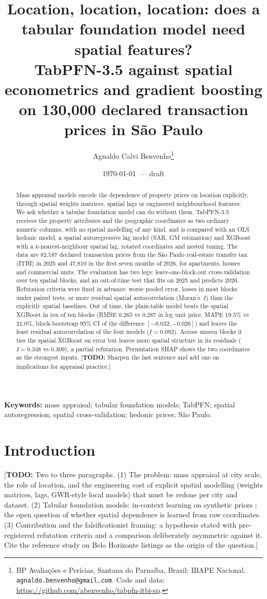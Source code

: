 \documentclass[11pt,a4paper]{article}
\title{Location, location, location: does a tabular foundation model need spatial features?\\
\large TabPFN-3.5 against spatial econometrics and gradient boosting on 130{,}000 declared
transaction prices in São Paulo}
\author{Agnaldo Calvi Benvenho\thanks{BP Avaliações e Perícias, Santana do Parnaíba, Brazil;
IBAPE Nacional. \texttt{agnaldo.benvenho@gmail.com}. Code and data:
\url{https://github.com/abenvenho/tabpfn-itbi-sp}.}}
\date{\today\ --- draft}
\newcommand{\todo}[1]{\textcolor{red!70!black}{[\textbf{TODO:} #1]}}
\begin{document}
\maketitle

\begin{abstract}
Mass appraisal models encode the dependence of property prices on location explicitly, through
spatial weights matrices, spatial lags or engineered neighbourhood features. We ask whether a
tabular foundation model can do without them. TabPFN-3.5 receives the property attributes and the
geographic coordinates as two ordinary numeric columns, with no spatial modelling of any kind, and is
compared with an OLS hedonic model, a spatial autoregressive lag model (SAR, GM estimation) and
XGBoost with a $k$-nearest-neighbour spatial lag, rotated coordinates and nested tuning. The data
are 82{,}187 declared transaction prices from the São Paulo real-estate transfer tax (ITBI) in 2025
and 47{,}810 in the first seven months of 2026, for apartments, houses and commercial units. The
evaluation has two legs: leave-one-block-out cross-validation over ten spatial blocks, and an
out-of-time test that fits on 2025 and predicts 2026. Refutation criteria were fixed in advance:
worse pooled error, losses in most blocks under paired tests, or more residual spatial
autocorrelation (Moran's~$I$) than the explicitly spatial baselines. Out of time, the plain-table
model beats the spatial XGBoost in ten of ten blocks (RMSE $0.265$ vs $0.287$ in log unit price,
MAPE $19.5\%$ vs $21.0\%$, block-bootstrap 95\% CI of the difference $[-0.032,-0.026]$) and leaves
the least residual autocorrelation of the four models ($I = 0.092$). Across unseen blocks it ties
the spatial XGBoost on error but leaves more spatial structure in its residuals ($I = 0.348$ vs
$0.309$), a partial refutation. Permutation SHAP shows the two coordinates as the strongest inputs.
\todo{Sharpen the last sentence and add one on implications for appraisal practice.}
\end{abstract}

\noindent\textbf{Keywords:} mass appraisal; tabular foundation models; TabPFN; spatial
autoregression; spatial cross-validation; hedonic prices; São Paulo.

\section{Introduction}
\label{sec:intro}

\todo{Two to three paragraphs. (1) The problem: mass appraisal at city scale, the role of location,
and the engineering cost of explicit spatial modelling (weights matrices, lags, GWR-style local
models) that must be redone per city and dataset. (2) Tabular foundation models: in-context
learning on synthetic priors \citep{hollmann2023tabpfn,hollmann2025nature,priorlabs2026tabpfn3};
the open question of whether spatial dependence is learned from raw coordinates. (3) Contribution
and the falsificationist framing: a hypothesis stated with pre-registered refutation criteria and a
comparison deliberately asymmetric against it. Cite the reference study on Belo Horizonte listings
\citep{benvenho2026cead} as the origin of the question.}
\end{document}
